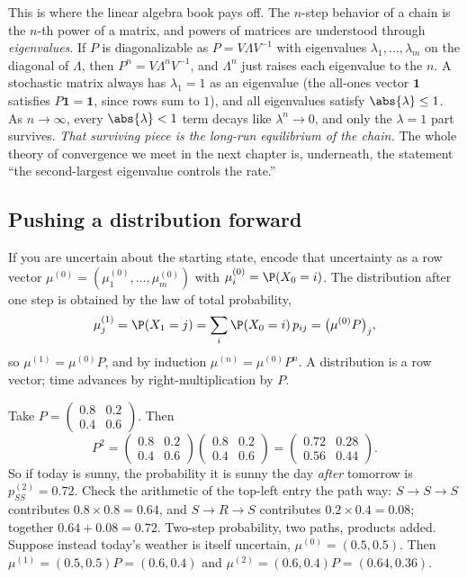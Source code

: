 \begin{connectionbox}
This is where the linear algebra book pays off. The $n$-step behavior of a chain is the $n$-th
power of a matrix, and powers of matrices are understood through \emph{eigenvalues}. If $P$ is
diagonalizable as $P = V \Lambda V^{-1}$ with eigenvalues $\lambda_1, \dots, \lambda_m$ on the
diagonal of $\Lambda$, then $P^n = V \Lambda^n V^{-1}$, and $\Lambda^n$ just raises each
eigenvalue to the $n$. A stochastic matrix always has $\lambda_1 = 1$ as an eigenvalue (the
all-ones vector $\mathbf{1}$ satisfies $P\mathbf{1} = \mathbf{1}$, since rows sum to $1$), and
all eigenvalues satisfy $\abs{\lambda} \le 1$. As $n \to \infty$, every $\abs{\lambda} < 1$
term decays like $\lambda^n \to 0$, and only the $\lambda = 1$ part survives. \emph{That
surviving piece is the long-run equilibrium of the chain.} The whole theory of convergence we
meet in the next chapter is, underneath, the statement ``the second-largest eigenvalue
controls the rate.''
\end{connectionbox}

\subsection{Pushing a distribution forward}

If you are uncertain about the starting state, encode that uncertainty as a row vector
$\mu^{(0)} = (\mu^{(0)}_1, \dots, \mu^{(0)}_m)$ with $\mu^{(0)}_i = \P(X_0 = i)$. The
distribution after one step is obtained by the law of total probability,
\[
  \mu^{(1)}_j = \P(X_1 = j) = \sum_i \P(X_0 = i)\,p_{ij} = \big(\mu^{(0)} P\big)_j,
\]
so $\mu^{(1)} = \mu^{(0)} P$, and by induction $\mu^{(n)} = \mu^{(0)} P^n$. A distribution is a
row vector; time advances by right-multiplication by $P$.

\begin{example}
\label{ch23:ex-weather-twostep}
Take $P = \left(\begin{smallmatrix} 0.8 & 0.2 \\ 0.4 & 0.6 \end{smallmatrix}\right)$. Then
\[
  P^2 = \begin{pmatrix} 0.8 & 0.2 \\ 0.4 & 0.6 \end{pmatrix}
        \begin{pmatrix} 0.8 & 0.2 \\ 0.4 & 0.6 \end{pmatrix}
      = \begin{pmatrix} 0.72 & 0.28 \\ 0.56 & 0.44 \end{pmatrix}.
\]
So if today is sunny, the probability it is sunny the day \emph{after} tomorrow is
$p_{SS}^{(2)} = 0.72$. Check the arithmetic of the top-left entry the path way: $S \to S \to
S$ contributes $0.8 \times 0.8 = 0.64$, and $S \to R \to S$ contributes $0.2 \times 0.4 =
0.08$; together $0.64 + 0.08 = 0.72$. Two-step probability, two paths, products added.
Suppose instead today's weather is itself uncertain, $\mu^{(0)} = (0.5, 0.5)$. Then
$\mu^{(1)} = (0.5,0.5)P = (0.6, 0.4)$ and $\mu^{(2)} = (0.6,0.4)P = (0.64, 0.36)$.
\end{example}

